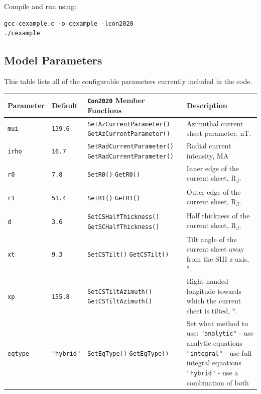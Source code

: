 	Compile and run using:
	
	\begin{verbatim}
gcc cexample.c -o cexample -lcon2020
./cexample
	\end{verbatim}
	
	\subsection{Model Parameters}
	
	This table lists all of the configurable parameters currently included in the code.
	
	\begin{tabular}{|l|l|l|p{5cm}|}
	  \hline
	  Parameter & Default & \texttt{Con2020} Member Functions & Description \\
	  \hline
	  \texttt{mui} & \texttt{139.6} & \texttt{SetAzCurrentParameter()} \newline \texttt{GetAzCurrentParameter()} & Azimuthal current sheet parameter, nT. \\
	  \texttt{irho} & \texttt{16.7} & \texttt{SetRadCurrentParameter()} \newline \texttt{GetRadCurrentParameter()} & Radial current intensity, MA \\
	  \texttt{r0} & \texttt{7.8} & \texttt{SetR0()} \newline \texttt{GetR0()} & Inner edge of the current sheet, R\textsubscript{J}. \\
	  \texttt{r1} & \texttt{51.4} & \texttt{SetR1()} \newline \texttt{GetR1()} & Outer edge of the current sheet, R\textsubscript{J}. \\
	  \texttt{d} & \texttt{3.6} & \texttt{SetCSHalfThickness()} \newline \texttt{GetSCHalfThickness()} & Half thickness of the current sheet, R\textsubscript{J}. \\
	  \texttt{xt} & \texttt{9.3} & \texttt{SetCSTilt()} \newline \texttt{GetCSTilt()} & Tilt angle of the current sheet away from the SIII z-axis, °. \\
	  \texttt{xp} & \texttt{155.8} & \texttt{SetCSTiltAzimuth()} \newline \texttt{GetCSTiltAzimuth()} & Right-handed longitude towards which the current sheet is tilted, °. \\
	  \texttt{eqtype} & \texttt{"hybrid"} & \texttt{SetEqType()} \newline \texttt{GetEqType()} & Set what method to use: \newline \texttt{"analytic"} - use analytic equations \newline \texttt{"integral"} - use full integral equations \newline \texttt{"hybrid"} - use a combination of both \\

\end{tabular}
